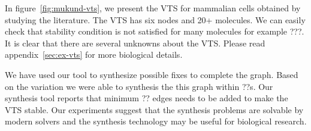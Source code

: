 
  
In figure~\ref{fig:mukund-vts}, we present the VTS for mammalian cells
obtained by studying the literature.
%
The VTS has six nodes and 20+ molecules.
%
We can easily check that stability condition is not satisfied for
many molecules for example ???.
%
It is clear that there are several unknowns about the VTS.
%
Please read appendix~\ref{sec:ex-vts} for more biological details.


We have used our tool to synthesize possible fixes to complete the
graph.
%
Based on the variation we were able to synthesis the this graph
within ??s.
%
Our synthesis tool reports that minimum ?? edges needs to be added to make
the VTS stable.
%
Our experiments suggest that the synthesis problems are
solvable by modern solvers and the synthesis technology may be useful
for biological research.

